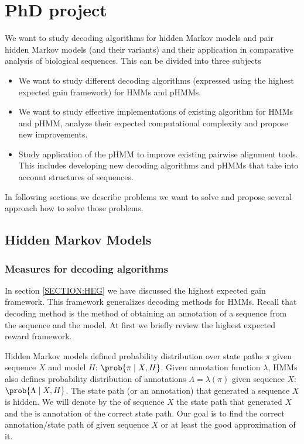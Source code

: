 \chapter{PhD project}

We want to study decoding algorithms for hidden Markov models and pair hidden
Markov models (and their variants) and their application in comparative analysis
of biological sequences. This can be divided into three subjects
\begin{itemize}
\item We want to study different decoding algorithms (expressed using the
highest expected gain framework) for HMMs and pHMMs.

\item We want to study effective implementations of existing algorithm for HMMs
and pHMM, analyze their expected computational complexity and propose new
improvements.

\item Study application of the pHMM to improve existing pairwise alignment
tools. This includes developing new decoding algorithms and pHMMs that take into
account structures of sequences.
\end{itemize}
In following sections we describe problems we want to solve and propose several
approach how to solve those problems.


\section{Hidden Markov Models}

\subsection{Measures for decoding algorithms}


In section \ref{SECTION:HEG} we have discussed the highest expected gain
framework. This framework generalizes decoding methods for HMMs. Recall that
decoding method is the method of obtaining an annotation of a sequence from the
sequence and the model. At first we briefly review the highest expected reward
framework.

Hidden Markov models defined probability distribution over state paths $\pi$
given sequence $X$ and model $H$: $\prob{\pi\mid X,H}$. Given annotation
function $\lambda$, HMMs also defines probability distribution of annotations
$\Lambda=\lambda(\pi)$ given sequence $X$: $\prob{\Lambda\mid X,H}$.  The state
path (or an annotation) that generated a sequence $X$ is hidden.
We will denote by
the  of sequence $X$ the state path that
generated $X$ and the  is annotation of the
correct state path. Our goal is to find the correct annotation/state path of
given sequence $X$ or at least the good approximation of it.

